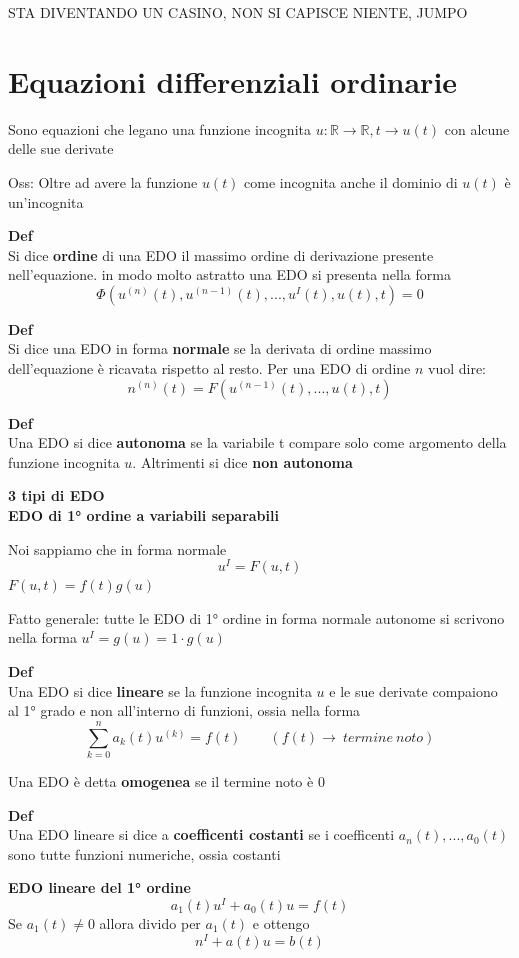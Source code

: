 \documentclass[12pt, a4paper]{article}
\begin{document}
STA DIVENTANDO UN CASINO, NON SI CAPISCE NIENTE, JUMPO

\newpage
\section{Equazioni differenziali ordinarie}
Sono equazioni che legano una funzione incognita $u:\mathbb{R}\to\mathbb{R}, t\to u(t)$ con alcune delle sue
derivate

Oss: Oltre ad avere la funzione $u(t)$ come incognita anche il dominio di $u(t)$ è un'incognita

\textbf{Def}\\Si dice \textbf{ordine} di una EDO il massimo ordine di derivazione presente nell'equazione.
in modo molto astratto una EDO si presenta nella forma
\[\Phi(u^{(n)}(t),u^{(n-1)}(t),...,u^{I}(t),u(t),t)=0\]

\textbf{Def}\\Si dice una EDO in forma \textbf{normale} se la derivata di ordine massimo dell'equazione è ricavata
rispetto al resto. Per una EDO di ordine $n$ vuol dire:\[n^{(n)}(t)=F(u^{(n-1)}(t),...,u(t),t)\]

\textbf{Def}\\Una EDO si dice \textbf{autonoma} se la variabile t compare solo come argomento della funzione
incognita $u$. Altrimenti si dice \textbf{non autonoma}

\textbf{3 tipi di EDO\\EDO di 1° ordine a variabili separabili}

Noi sappiamo che in forma normale \[u^{I}=F(u,t)\]
$F(u,t)=f(t)g(u)$

Fatto generale: tutte le EDO di 1° ordine in forma normale autonome si scrivono nella forma
$u^{I}=g(u)=1\cdot g(u)$

\textbf{Def}\\Una EDO si dice \textbf{lineare} se la funzione incognita $u$ e le sue derivate compaiono al 1° grado
e non all'interno di funzioni, ossia nella forma \[\sum^{n}_{k=0}a_{k}(t)u^{(k)}=f(t)\qquad(f(t)\to\ termine\ noto)\]

Una EDO è detta \textbf{omogenea} se il termine noto è 0

\textbf{Def}\\Una EDO lineare si dice a \textbf{coefficenti costanti} se i coefficenti $a_{n}(t),...,a_{0}(t)$
sono tutte funzioni numeriche, ossia costanti

\textbf{EDO lineare del 1° ordine}\[a_{1}(t)u^{I}+a_{0}(t)u=f(t)\] Se $a_{1}(t)\neq 0$ allora divido per $a_{1}(t)$
e ottengo \[n^{I}+a(t)u=b(t)\]
\end{document}
